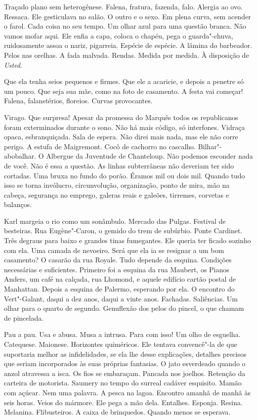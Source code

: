 Traçado plano sem heterogênese. Falena, fratura, fazenda, falo. Alergia
ao ovo. Ressaca. Ele gesticulava no salão. O outro e o sexo. Em plena
curva, sem acender o farol. Cada coisa no seu tempo. Um olhar azul para
uma questão branca. Não vamos mofar aqui. Ele enfia a capa, coloca o
chapéu, pega o guarda"-chuva, ruidosamente assoa o nariz, pigarreia.
Espécie de espécie. A lâmina do barbeador. Pelos nas orelhas. A fada
malvada. Rendas. Medida por medida. À disposição de \emph{Usted}.

Que ela tenha seios pequenos e firmes. Que ele a acaricie, e depois a
penetre só um pouco. Que seja sua mãe, como na foto de casamento. A
festa vai começar! Falena, falanstérios, floreios. Curvas provocantes.

Virago. Que surpresa! Apesar da promessa do Marquês todos os
republicanos foram exterminados durante o sono. Não há mais código, só
interfones. Vidraça opaca, esbranquiçada. Sala de espera. Não direi mais
nada, mas ele não corre perigo. A estufa de Maigremont. Cocô de cachorro
no cascalho. Bilhar"-abobalhar. O Albergue da Juventude de Chanteloup.
Não podemos esconder nada de você. Não é essa a questão. As linhas
subterrâneas não deveriam ter sido cortadas. Uma bruxa no fundo do
porão. Éramos mil ou dois mil. Quando tudo isso se torna invólucro,
circunvolução, organização, ponto de mira, mão na cabeça, segurança no
emprego, galeras reais e galeões, tirremes, corvetas e balanços.

Karl margeia o rio como um sonâmbulo. Mercado das Pulgas. Festival de
besteiras. Rua Eugène"-Caron, o gemido do trem de subúrbio. Ponte
Cardinet. Três degraus para baixo e grandes tinas fumegantes. Ele queria
ter ficado sozinho com ela. Uma camada de nevoeiro. Será que ela ia se
resignar a um bom casamento? O casarão da rua Royale. Tudo depende da
esquina. Condições necessárias e suficientes. Primeiro foi a esquina da
rua Maubert, os Pianos Anders, um café na calçada, rua Lhomond, e aquele
edifício cartão postal de Manhattan. Depois a esquina de Palermo,
esperando por ela. O encontro do Vert"-Galant, daqui a dez anos, daqui a
vinte anos. Fachadas. Saliências. Um olhar para o quarto de segundo.
Genuflexão dos pelos do pincel, o que chamam de pincelada.

Pau a pau. Usa e abusa. Musa a intrusa. Para com isso! Um olho de
esguelha. Catequese. Maionese. Horizontes quiméricos. Ele tentava
convencê"-la de que suportaria melhor as infidelidades, se ela lhe desse
explicações, detalhes precisos que seriam incorporados às suas próprias
fantasias. O jato esverdeado quando o anzol atravessa a isca. Os fios se
embaraçam. Pancada nos joelhos. Retenção da carteira de motorista.
Saumery no tempo do surreal cadáver esquisito. Mamão com açúcar.
Nem uma palavra. A pesca na lagoa. Encontro amanhã de manhã às seis
horas. Veios do mármore. Ele pega a mão dela. Entalhes. Esponja. Resina.
Melanina. Flibusteiros. A caixa de brinquedos. Quando menos se esperava.

